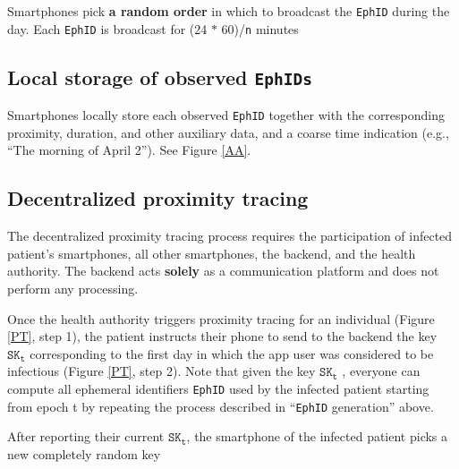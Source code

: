 \documentclass[12pt,a4paper]{article}
\begin{document}
Smartphones pick \textbf{a random order} in which to broadcast the \texttt{EphID} during the day. Each \texttt{EphID} is broadcast for (24 $\ast$ 60)/\texttt{n}  minutes
\subsection*{Local storage of observed \texttt{EphIDs}}
Smartphones locally store each observed \texttt{EphID} together with the corresponding proximity, duration, and other auxiliary data, and a coarse time indication (e.g., “The morning of April 2”). See Figure \ref{AA}.
\subsection*{Decentralized proximity tracing}
The decentralized proximity tracing process requires the participation of infected patient’s smartphones, all other smartphones, the backend, and the health authority. The backend acts \textbf{solely}  as a communication platform and does not perform any processing.

Once the health authority triggers proximity tracing for an individual (Figure \ref{PT}, step 1), the patient instructs their phone to send to the backend the key $\texttt{SK}_\texttt{t}$ corresponding to the first day in which the app user was considered to be infectious (Figure \ref{PT}, step 2). Note that given the key $\texttt{SK}_\texttt{t}$ , everyone can compute all ephemeral identifiers \texttt{EphID} used by the infected patient starting from epoch t by repeating the process described in “\texttt{EphID} generation” above.

After reporting their current $\texttt{SK}_\texttt{t}$, the smartphone of the infected patient picks a new completely random key
\end{document}
